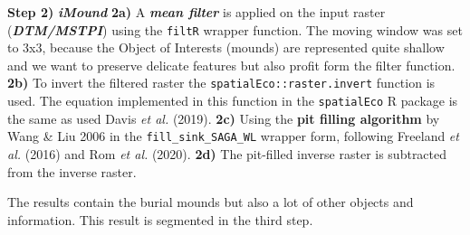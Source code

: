 \documentclass[
  12pt,
]{article}
\begin{document}
\textbf{Step 2)} \textbf{\emph{iMound}}
\newline 
\textbf{2a)} A \textbf{\emph{mean filter}} is applied on the input raster (\textbf{\emph{DTM/MSTPI}}) using the \texttt{filtR} wrapper function. The moving window was set to 3x3, because the Object of Interests (mounds) are represented quite shallow and we want to preserve delicate features but also profit form the filter function.
\newline
\textbf{2b)} To invert the filtered raster the \texttt{spatialEco::raster.invert} function is used. The equation implemented in this function in the \texttt{spatialEco} R package is the same as used Davis \emph{et al.} (2019).
\newline
\textbf{2c)} Using the \textbf{pit filling algorithm} by Wang \& Liu 2006 in the \texttt{fill\_sink\_SAGA\_WL} wrapper form, following Freeland \emph{et al.} (2016) and Rom \emph{et al.} (2020).
\newline
\textbf{2d)} The pit-filled inverse raster is subtracted from the inverse raster.

The results contain the burial mounds but also a lot of other objects and information. This result is segmented in the third step.
\end{document}
